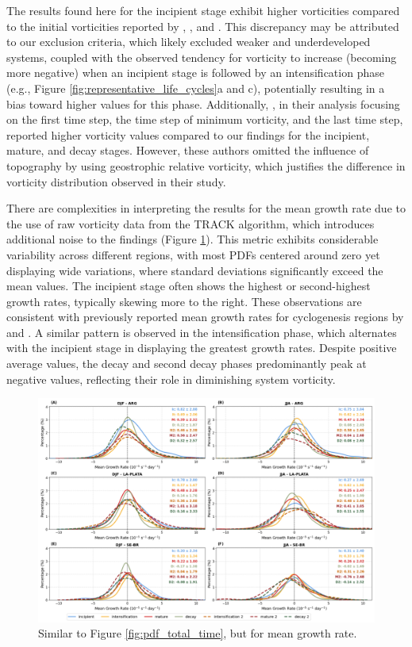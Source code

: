 The results found here for the incipient stage exhibit higher vorticities compared to the initial vorticities reported by \citet{reboita2010south}, \citet{gramcianinov2019properties}, and \citet{gramcianinov2020analysis}. This discrepancy may be attributed to our exclusion criteria, which likely excluded weaker and underdeveloped systems, coupled with the observed tendency for vorticity to increase (becoming more negative) when an incipient stage is followed by an intensification phase (e.g., Figure \ref{fig:representative_life_cycles}a and c), potentially resulting in a bias toward higher values for this phase. Additionally, \citet{sinclair1995climatology}, in their analysis focusing on the first time step, the time step of minimum vorticity, and the last time step, reported higher vorticity values compared to our findings for the incipient, mature, and decay stages. However, these authors omitted the influence of topography by using geostrophic relative vorticity, which justifies the difference in vorticity distribution observed in their study.

There are complexities in interpreting the results for the mean growth rate due to the use of raw vorticity data from the TRACK algorithm, which introduces additional noise to the findings (Figure \ref{fig:pdf_mean_growth_rate}). This metric exhibits considerable variability across different regions, with most PDFs centered around zero yet displaying wide variations, where standard deviations significantly exceed the mean values. The incipient stage often shows the highest or second-highest growth rates, typically skewing more to the right. These observations are consistent with previously reported mean growth rates for cyclogenesis regions by \cite{hoskins2005new} and \cite{gramcianinov2019properties}. A similar pattern is observed in the intensification phase, which alternates with the incipient stage in displaying the greatest growth rates. Despite positive average values, the decay and second decay phases predominantly peak at negative values, reflecting their role in diminishing system vorticity.

\begin{figure}[h!]
\centering
\includegraphics[width=\textwidth]{figs_4/pdf_mean_growth_rate.png}
\caption[PDF - Mean Growth Rate]{Similar to Figure \ref{fig:pdf_total_time}, but for mean growth rate.}
\label{fig:pdf_mean_growth_rate}
\end{figure}



